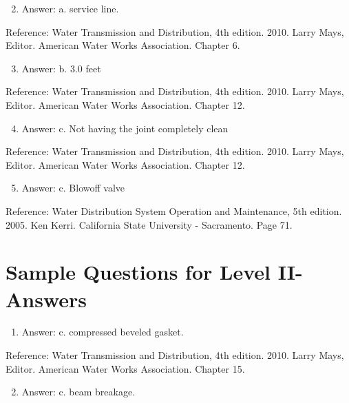 \documentclass[10pt]{article}
\begin{document}
\begin{enumerate}
  \setcounter{enumi}{1}
  \item Answer: a. service line.
\end{enumerate}

Reference: Water Transmission and Distribution, 4th edition. 2010. Larry Mays, Editor. American Water Works Association. Chapter 6.

\begin{enumerate}
  \setcounter{enumi}{2}
  \item Answer: b. $3.0$ feet
\end{enumerate}

Reference: Water Transmission and Distribution, 4th edition. 2010. Larry Mays, Editor. American Water Works Association. Chapter 12.

\begin{enumerate}
  \setcounter{enumi}{3}
  \item Answer: c. Not having the joint completely clean
\end{enumerate}

Reference: Water Transmission and Distribution, 4th edition. 2010. Larry Mays, Editor. American Water Works Association. Chapter 12.

\begin{enumerate}
  \setcounter{enumi}{4}
  \item Answer: c. Blowoff valve
\end{enumerate}

Reference: Water Distribution System Operation and Maintenance, 5th edition. 2005. Ken Kerri. California State University - Sacramento. Page 71.

\section{Sample Questions for Level II-Answers}
\begin{enumerate}
  \item Answer: c. compressed beveled gasket.
\end{enumerate}

Reference: Water Transmission and Distribution, 4th edition. 2010. Larry Mays, Editor. American Water Works Association. Chapter 15.

\begin{enumerate}
  \setcounter{enumi}{1}
  \item Answer: c. beam breakage.
\end{enumerate}
\end{document}
